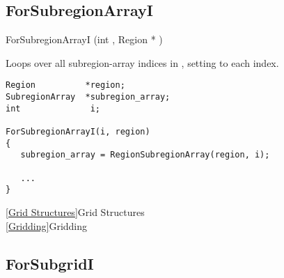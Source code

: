 \newpage
\subsection{ForSubregionArrayI}
\label{ForSubregionArrayI}


\begin{defmac} ForSubregionArrayI (int , {Region *} )

\DESCRIPTION
Loops over all subregion-array indices in , setting
 to each index.

\EXAMPLE
\mbox{}
\begin{display}\begin{verbatim}
Region          *region;
SubregionArray  *subregion_array;
int              i;

ForSubregionArrayI(i, region)
{
   subregion_array = RegionSubregionArray(region, i);

   ...
}
\end{verbatim}\end{display}


\SEEALSO
\vref{Grid Structures}{Grid Structures}\\
\vref{Gridding}{Gridding}

\end{defmac}


\newpage
\subsection{ForSubgridI}
\label{ForSubgridI}


